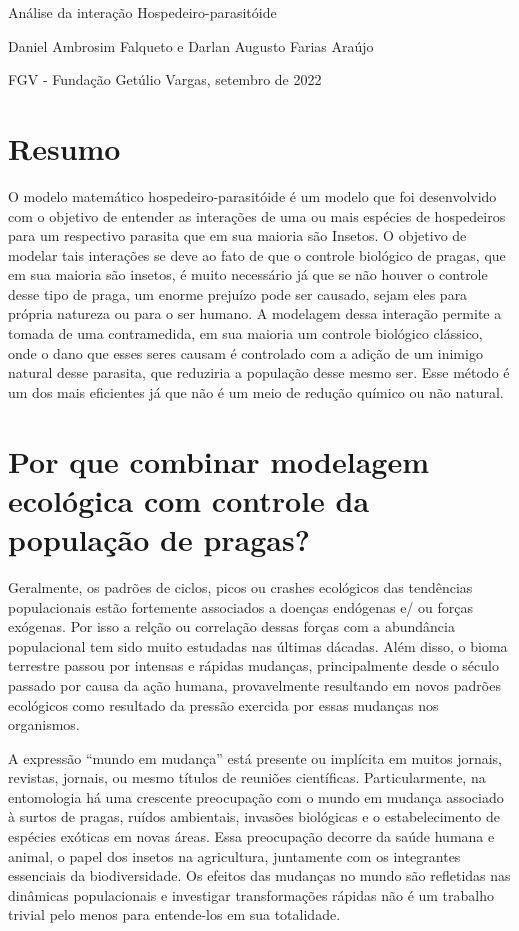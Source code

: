 \begin{center}
    {\huge  Análise da interação Hospedeiro-parasitóide}
    
    \medskip
    
    {\large Daniel Ambrosim Falqueto e Darlan Augusto Farias Araújo}
    
    \medskip
    
    FGV - Fundação Getúlio Vargas, setembro de 2022
\end{center}

\section{Resumo}

O modelo matemático hospedeiro-parasitóide é um modelo que foi desenvolvido com o objetivo de entender as interações de uma ou mais espécies de hospedeiros para um respectivo parasita que em sua maioria são Insetos. O objetivo de modelar tais interações se deve ao fato de que o controle biológico de pragas, que em sua maioria são insetos, é muito necessário já que se não houver o controle desse tipo de praga, um enorme prejuízo pode ser causado, sejam eles para própria natureza ou para o ser humano. A modelagem dessa interação permite a tomada de uma contramedida, em sua maioria um controle biológico clássico, onde o dano que esses seres causam é controlado com a adição de um inimigo natural desse parasita, que reduziria a população desse mesmo ser. Esse método é um dos mais eficientes já que não é um meio de redução químico ou não natural.

\section{Por que combinar modelagem ecológica com controle da população de pragas?}

Geralmente, os padrões de ciclos, picos ou crashes ecológicos das tendências populacionais estão fortemente associados a doenças endógenas e/
ou forças exógenas. Por isso a relção ou correlação dessas forças com a abundância populacional tem sido muito estudadas nas últimas dácadas. Além disso, o bioma terrestre passou por intensas e rápidas mudanças, principalmente desde o século passado por causa da ação humana, provavelmente resultando em novos padrões ecológicos como resultado da pressão exercida por essas mudanças nos organismos.

A expressão “mundo em mudança” está presente ou implícita em muitos jornais, revistas, jornais, ou mesmo títulos de reuniões científicas. Particularmente, na entomologia há uma crescente preocupação com o mundo em mudança associado à surtos de pragas, ruídos ambientais, invasões biológicas e o estabelecimento de espécies exóticas em novas áreas. Essa preocupação decorre da saúde humana e animal, o papel dos insetos na agricultura, juntamente com os integrantes essenciais da biodiversidade. Os efeitos das mudanças no mundo são refletidas nas dinâmicas populacionais e investigar transformações rápidas não é um trabalho trivial pelo menos para entende-los em sua totalidade.

